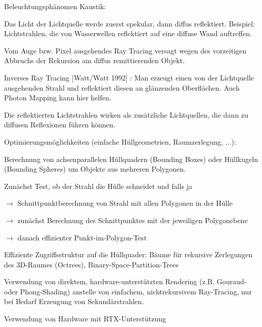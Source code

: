 \documentclass[landscape]{article}
\begin{document}
\begin{multicols}{3}
  Beleuchtungsphänomen Kaustik:
  \begin{itemize*}
    \item Das Licht der Lichtquelle werde zuerst spekular, dann diffus reflektiert. Beispiel: Lichtstrahlen, die von Wasserwellen reflektiert auf eine diffuse Wand auftreffen.
    \item Vom Auge bzw. Pixel ausgehendes Ray Tracing versagt wegen des vorzeitigen Abbruchs der Rekursion am diffus remittierenden Objekt.
    \item Inverses Ray Tracing [Watt/Watt 1992] : Man erzeugt einen von der Lichtquelle ausgehenden Strahl und reflektiert diesen an glänzenden Oberflächen. Auch Photon Mapping kann hier helfen.
    \item Die reflektierten Lichtstrahlen wirken als zusätzliche Lichtquellen, die dann zu diffusen Reflexionen führen können.
  \end{itemize*}
  
  Optimierungsmöglichkeiten (einfache Hüllgeometrien, Raumzerlegung, ...):
  \begin{itemize*}
    \item Berechnung von achsenparallelen Hüllquadern (Bounding Boxes) oder Hüllkugeln (Bounding Spheres) um Objekte aus mehreren Polygonen.
    \item Zunächst Test, ob der Strahl die Hülle schneidet und falls ja
    \item $\rightarrow$ Schnittpunktberechnung von Strahl mit allen Polygonen in der Hülle
    \item $\rightarrow$ zunächst Berechnung des Schnittpunktes mit der jeweiligen Polygonebene
    \item $\rightarrow$ danach effizienter Punkt-im-Polygon-Test
    \item Effiziente Zugriffsstruktur auf die Hüllquader: Bäume für rekursive Zerlegungen des 3D-Raumes (Octrees), Binary-Space-Partition-Trees
    \item Verwendung von direktem, hardware-unterstützten Rendering (z.B. Gouraud- oder Phong-Shading) anstelle von einfachem, nichtrekursivem Ray-Tracing, nur bei Bedarf Erzeugung von Sekundärstrahlen.
    \item Verwendung von Hardware mit RTX-Unterstützung
  \end{itemize*}
  

\end{multicols}
\end{document}
